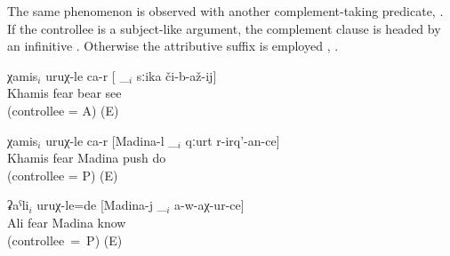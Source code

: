 The same phenomenon is observed with another complement-taking predicate,  . If the controllee is a subject-like argument, the complement clause is headed by an infinitive . Otherwise the attributive suffix  is employed , .
%
\begin{exe}
	\ex	\label{ex:Khamis, bears, Madina, Ali@46}
	\begin{xlist}
		\ex	\label{ex:Khamis fears to see the bear@46a}
		\gll	χamis$_{i}$	uruχ-le ca-r	[ \_$_{i}$	sːika	či-b-až-ij]\\
			Khamis	fear 	{} 	bear	see\\
		\glt	{} (controllee = A) (E)

		\ex	\label{ex:Khamis fears that Madina pushes her@46b}
		\gll	χamis$_{i}$	uruχ-le ca-r	[Madina-l	\_$_{i}$	qːurt	r-irq'-an-ce]\\
			Khamis	fear 	Madina		push	do\\
		\glt	{} (controllee = P) (E)

		\ex	\label{ex:Ali feared that Madina would not recognize / know him@46c}
		\gll	ʡaˁli$_{i}$	uruχ-le=de	[Madina-j	\_$_{i}$	a-w-aχ-ur-ce]\\
			Ali	fear	Madina		know\\
		\glt	{}  (controllee~=~P) (E)
	\end{xlist}
\end{exe}

